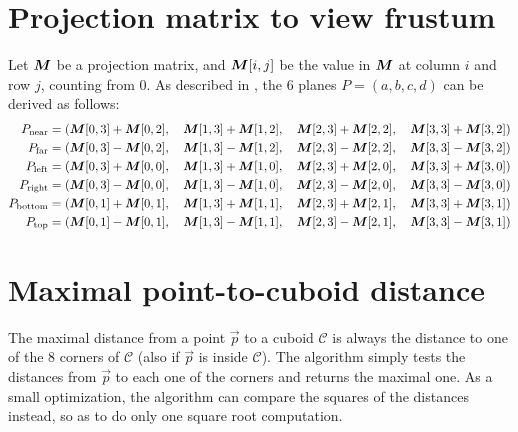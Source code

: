 \documentclass[a4paper,10pt,abstracton,notitlepage]{scrreprt}
\begin{document}
\section{Projection matrix to view frustum} \label{frustum_planes}
Let $\matrixsym{M}$ be a projection matrix, and $\matrixsym{M}[i, j]$ be the value in $\matrixsym{M}$ at column $i$ and row $j$, counting from 0.
As described in \cite{Gri2001}, the 6 planes $P = (a, b, c, d)$ can be derived as follows:
\begin{align*}
	P_{\text{near}}   = (\matrixsym{M}[0, 3] + \matrixsym{M}[0, 2], \quad \matrixsym{M}[1, 3] + \matrixsym{M}[1, 2], \quad \matrixsym{M}[2, 3] + \matrixsym{M}[2, 2], \quad \matrixsym{M}[3, 3] + \matrixsym{M}[3, 2]) \\
	P_{\text{far}}    = (\matrixsym{M}[0, 3] - \matrixsym{M}[0, 2], \quad \matrixsym{M}[1, 3] - \matrixsym{M}[1, 2], \quad \matrixsym{M}[2, 3] - \matrixsym{M}[2, 2], \quad \matrixsym{M}[3, 3] - \matrixsym{M}[3, 2]) \\
	P_{\text{left}}   = (\matrixsym{M}[0, 3] + \matrixsym{M}[0, 0], \quad \matrixsym{M}[1, 3] + \matrixsym{M}[1, 0], \quad \matrixsym{M}[2, 3] + \matrixsym{M}[2, 0], \quad \matrixsym{M}[3, 3] + \matrixsym{M}[3, 0]) \\
	P_{\text{right}}  = (\matrixsym{M}[0, 3] - \matrixsym{M}[0, 0], \quad \matrixsym{M}[1, 3] - \matrixsym{M}[1, 0], \quad \matrixsym{M}[2, 3] - \matrixsym{M}[2, 0], \quad \matrixsym{M}[3, 3] - \matrixsym{M}[3, 0]) \\
	P_{\text{bottom}} = (\matrixsym{M}[0, 1] + \matrixsym{M}[0, 1], \quad \matrixsym{M}[1, 3] + \matrixsym{M}[1, 1], \quad \matrixsym{M}[2, 3] + \matrixsym{M}[2, 1], \quad \matrixsym{M}[3, 3] + \matrixsym{M}[3, 1]) \\
	P_{\text{top}}    = (\matrixsym{M}[0, 1] - \matrixsym{M}[0, 1], \quad \matrixsym{M}[1, 3] - \matrixsym{M}[1, 1], \quad \matrixsym{M}[2, 3] - \matrixsym{M}[2, 1], \quad \matrixsym{M}[3, 3] - \matrixsym{M}[3, 1])
\end{align*}

\section{Maximal point-to-cuboid distance}
The maximal distance from a point $\overrightarrow{p}$ to a cuboid $\mathcal{C}$ is always the distance to one of the 8 corners of $\mathcal{C}$ (also if $\overrightarrow{p}$ is inside $\mathcal{C}$). The algorithm simply tests the distances from $\overrightarrow{p}$ to each one of the corners and returns the maximal one. As a small optimization, the algorithm can compare the squares of the distances instead, so as to do only one square root computation.
\end{document}
